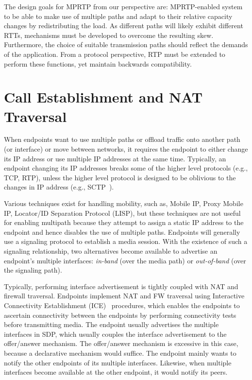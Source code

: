 The design goals for MPRTP from our perspective are: MPRTP-enabled system to
be able to make use of multiple paths and adapt to their relative capacity
changes by redistributing the load. As different paths will likely exhibit
different RTTs, mechanisms must be developed to overcome the resulting skew.
Furthermore, the choice of suitable transmission paths should reflect the
demands of the application. From a protocol perspective, RTP must be extended
to perform these functions, yet maintain backwards compatibility. 

\section{Call Establishment and NAT Traversal}

When endpoints want to use multiple paths or offload traffic onto another path
(or interface) or move between networks, it requires the endpoint to either
change its IP address or use multiple IP addresses at the same time.
Typically, an endpoint changing its IP addresses breaks some of the higher
level protocols (e.g., TCP, RTP), unless the higher level protocol is designed
to be oblivious to the changes in IP address (e.g., SCTP~\cite{rfc4960}).

Various techniques exist for handling mobility, such as, Mobile IP, Proxy
Mobile IP, Locator/ID Separation Protocol (LISP), but these techniques are not
useful for enabling multipath because they attempt to assign a static IP
address to the endpoint and hence disables the use of multiple paths.
Endpoints will generally use a signaling protocol to establish a media
session. With the existence of such a signaling relationship, two alternatives
become available to advertise an endpoint's multiple interfaces:
\emph{in-band} (over the media path) or \emph{out-of-band} (over the signaling
path).

Typically, performing interface advertisement is tightly coupled with NAT and
firewall traversal. Endpoints implement NAT and FW traversal using Interactive
Connectivity Establishment (ICE)~\cite{rfc5245} procedures, which enables the
endpoints to ascertain connectivity between the endpoints by performing
connectivity tests before transmitting media. The endpoint usually advertises
the multiple interfaces in SDP, which usually couples the interface
advertisement to the offer/answer mechanism. The offer/answer mechanism is
excessive in this case, because a declarative mechanism would suffice. The
endpoint mainly wants to notify the other endpoints of its multiple
interfaces. Likewise, when multiple interfaces become available at the other
endpoint, it would notify its peers.

